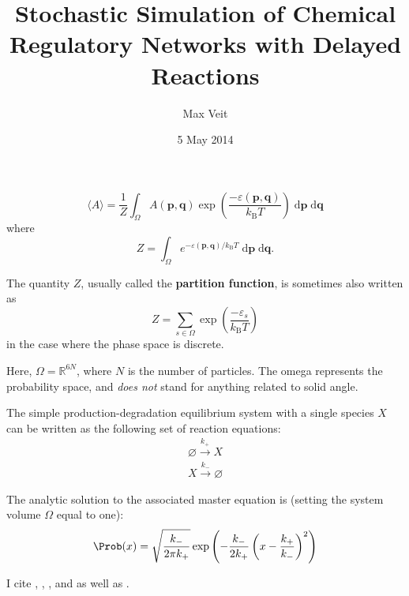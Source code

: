 \documentclass[english,letterpaper,12pt]{article}
\newcommand{\dee}{\;\mathrm{d}}
\renewcommand{\vec}[1]{\ensuremath{\mathbf{#1}}}
\newcommand{\kB}{\ensuremath{k_\mathrm{B}}}
\begin{document}
\title{Stochastic Simulation of Chemical Regulatory Networks with Delayed Reactions}
\author{Max Veit}
\date{5 May 2014}

\maketitle

\begin{doublespacing}

\lipsum[1-2]

\begin{equation}
    \langle A \rangle = \frac{1}{Z} \int_\Omega A(\vec{p}, \vec{q}) \exp\left(\frac{-\varepsilon(\vec{p}, \vec{q})}{\kB T}\right) \dee \vec{p} \dee \vec{q}
\end{equation}
where
\begin{equation}
    Z = \int_\Omega e^{-\varepsilon(\vec{p}, \vec{q}) / \kB T}\dee \vec{p} \dee \vec{q}.
\end{equation}

The quantity $Z$, usually called the \textbf{partition function}, is sometimes also written as
\begin{equation}
    Z = \sum_{s \in \Omega} \exp\left( \frac{-\varepsilon_s}{\kB T} \right)
    \label{eq:partfun-discrete}
\end{equation}
in the case where the phase space is discrete.

Here, $\Omega = \mathbb{R}^{6N}$, where $N$ is the number of particles. The omega represents the probability space, and \emph{does not} stand for anything related to solid angle.

The simple production-degradation equilibrium system with a single species $X$ can be written as the following set of reaction equations:
\begin{align}
    \varnothing \xrightarrow{k_+} X \\
    X \xrightarrow {k_-} \varnothing
    \label{eq:prod-deg-rxn}
\end{align}

The analytic solution to the associated master equation is (setting the system volume $\Omega$ equal to one):
\begin{equation}
    \Prob(x) = \sqrt{\frac{k_-}{2\pi k_+}}\exp\left( -\frac{k_-}{2k_+} \left( x - \frac{k_+}{k_-} \right)^2 \right)
    \label{eq:prod-deg-ans}
\end{equation}

I cite \cite{bistable-modeling}, \cite{we-exact}, \cite{we-chemkin}, and \cite{delay-oscillations} as well as \cite{gillespie-ssa}.

\lipsum[3-4]

\end{doublespacing}



\end{document}
